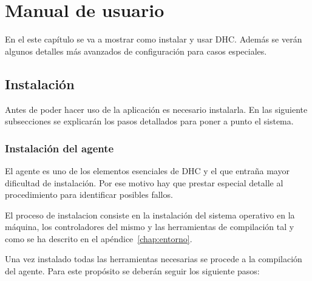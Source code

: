 \chapter{Manual de usuario} 

En el este capítulo se va a mostrar como instalar y usar DHC. Además se verán algunos detalles más avanzados de configuración para casos especiales.

\section{Instalación}

Antes de poder hacer uso de la aplicación es necesario instalarla. En las siguiente subsecciones se explicarán los pasos detallados para poner a punto el sistema.

\subsection{Instalación del agente}

El agente es uno de los elementos esenciales de DHC y el que entraña mayor dificultad de instalación. Por ese motivo hay que prestar especial detalle al procedimiento para identificar posibles fallos.

El proceso de instalacion consiste en la instalación del sistema operativo en la máquina, los controladores del mismo y las herramientas de compilación tal y como se ha descrito en el apéndice~\ref{chap:entorno}.

Una vez instalado todas las herramientas necesarias se procede a la compilación del agente. Para este propósito se deberán seguir los siguiente pasos:

